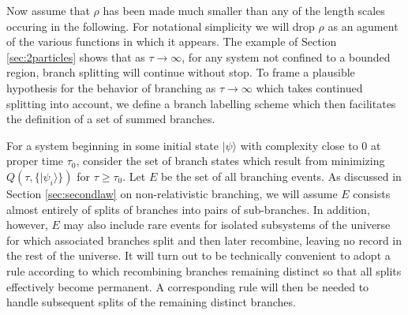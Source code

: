 \documentclass[twocolumn,amsmath,amssymb]{revtex4-1}
\begin{document}
Now assume that
$\rho$ has been made much smaller than any of the
length scales occuring in the following.
For notational simplicity we will drop $\rho$ as an agument
of the various functions in which it appears.
The example of Section \ref{sec:2particles}
shows that as $\tau \rightarrow \infty$, for any system
not confined to a bounded region, branch splitting
will continue without stop.
To frame a plausible hypothesis for
the behavior of branching as $\tau \rightarrow \infty$
which takes continued splitting into account,
we define a  
branch labelling scheme
which then
facilitates the definition
of a set of summed
branches.

For a system beginning in some initial state $|\psi \rangle $ with
complexity close to 0 at
proper time $\tau_0$, 
consider the set of branch states
which result
from minimizing $Q(\tau, \{|\psi_i \rangle \})$ for $\tau \ge \tau_0$.
Let $E$ be the set of all branching events.
As discussed in Section \ref{sec:secondlaw} on non-relativistic branching,
we will assume $E$ consists almost entirely of splits of branches into
pairs of sub-branches.
In addition, however,
$E$ may also include rare events
for isolated subsystems of the universe for which
associated branches split and then later recombine,
leaving no record in the rest of the universe.
It will turn out to be technically convenient to adopt a rule
according to which
recombining branches
remaining distinct
so that all splits effectively
become permanent. A
corresponding rule will then be needed to handle
subsequent splits of the remaining distinct branches.
\end{document}
